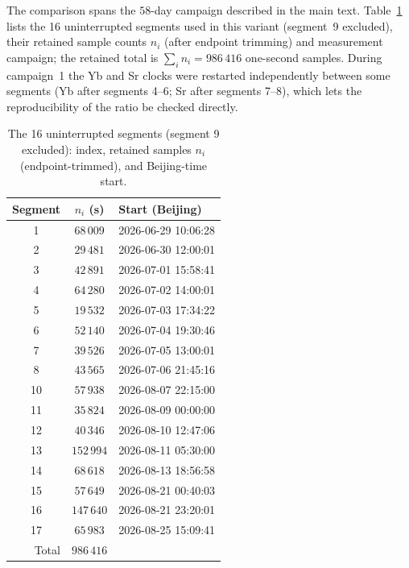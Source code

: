 \documentclass[11pt,a4paper]{article}
\begin{document}
The comparison spans the $58$-day campaign described in the main text.
Table~\ref{tab:segments} lists the 16 uninterrupted segments used in this
variant (segment~9 excluded), their
retained sample counts $n_i$ (after endpoint trimming) and measurement
campaign; the retained total is $\sum_i n_i = 986\,416$ one-second
samples. During campaign~1 the Yb and Sr clocks were restarted
independently between some segments (Yb after segments 4--6; Sr after
segments 7--8), which lets the reproducibility of the ratio be checked
directly.

\begin{table}[t]
  \centering
  \caption{The 16 uninterrupted segments (segment 9 excluded): index,
  retained samples $n_i$ (endpoint-trimmed), and Beijing-time start.}
  \label{tab:segments}
  \begin{tabular}{ccl}
    \toprule
    Segment & $n_i$ (s) & Start (Beijing) \\
    \midrule
    1  & $68\,009$  & 2026-06-29 10:06:28 \\
    2  & $29\,481$  & 2026-06-30 12:00:01 \\
    3  & $42\,891$  & 2026-07-01 15:58:41 \\
    4  & $64\,280$  & 2026-07-02 14:00:01 \\
    5  & $19\,532$  & 2026-07-03 17:34:22 \\
    6  & $52\,140$  & 2026-07-04 19:30:46 \\
    7  & $39\,526$  & 2026-07-05 13:00:01 \\
    8  & $43\,565$  & 2026-07-06 21:45:16 \\
    10 & $57\,938$  & 2026-08-07 22:15:00 \\
    11 & $35\,824$  & 2026-08-09 00:00:00 \\
    12 & $40\,346$  & 2026-08-10 12:47:06 \\
    13 & $152\,994$ & 2026-08-11 05:30:00 \\
    14 & $68\,618$  & 2026-08-13 18:56:58 \\
    15 & $57\,649$  & 2026-08-21 00:40:03 \\
    16 & $147\,640$ & 2026-08-21 23:20:01 \\
    17 & $65\,983$  & 2026-08-25 15:09:41 \\
    \midrule
    \multicolumn{1}{r}{Total} & $986\,416$ & \\
    \bottomrule
  \end{tabular}
\end{table}
\end{document}
